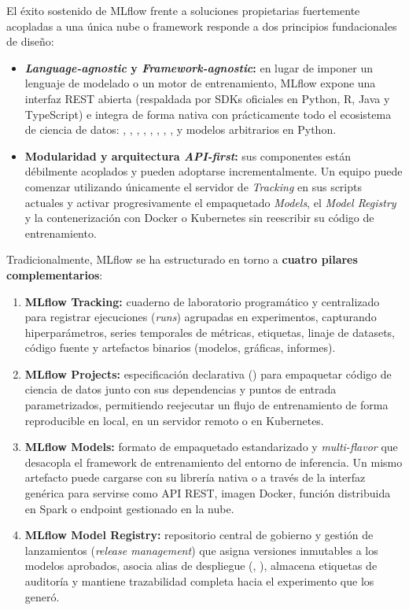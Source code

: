 El éxito sostenido de MLflow frente a soluciones propietarias fuertemente acopladas a una única nube o framework responde a dos principios fundacionales de diseño:

\begin{itemize}
  \item \textbf{\textit{Language-agnostic} y \textit{Framework-agnostic}:} en lugar de imponer un lenguaje de modelado o un motor de entrenamiento, MLflow expone una interfaz REST abierta (respaldada por SDKs oficiales en Python, R, Java y TypeScript) e integra de forma nativa con prácticamente todo el ecosistema de ciencia de datos: , , , , , , , ,  y modelos arbitrarios en Python.
  \item \textbf{Modularidad y arquitectura \textit{API-first}:} sus componentes están débilmente acoplados y pueden adoptarse incrementalmente. Un equipo puede comenzar utilizando únicamente el servidor de \textit{Tracking} en sus scripts actuales y activar progresivamente el empaquetado \textit{Models}, el \textit{Model Registry} y la contenerización con Docker o Kubernetes sin reescribir su código de entrenamiento.
\end{itemize}

Tradicionalmente, MLflow se ha estructurado en torno a \textbf{cuatro pilares complementarios}:

\begin{enumerate}
  \item \textbf{MLflow Tracking:} cuaderno de laboratorio programático y centralizado para registrar ejecuciones (\textit{runs}) agrupadas en experimentos, capturando hiperparámetros, series temporales de métricas, etiquetas, linaje de datasets, código fuente y artefactos binarios (modelos, gráficas, informes).
  \item \textbf{MLflow Projects:} especificación declarativa () para empaquetar código de ciencia de datos junto con sus dependencias y puntos de entrada parametrizados, permitiendo reejecutar un flujo de entrenamiento de forma reproducible en local, en un servidor remoto o en Kubernetes.
  \item \textbf{MLflow Models:} formato de empaquetado estandarizado y \textit{multi-flavor} que desacopla el framework de entrenamiento del entorno de inferencia. Un mismo artefacto puede cargarse con su librería nativa o a través de la interfaz genérica  para servirse como API REST, imagen Docker, función distribuida en Spark o endpoint gestionado en la nube.
  \item \textbf{MLflow Model Registry:} repositorio central de gobierno y gestión de lanzamientos (\textit{release management}) que asigna versiones inmutables a los modelos aprobados, asocia alias de despliegue (, ), almacena etiquetas de auditoría y mantiene trazabilidad completa hacia el experimento que los generó.
\end{enumerate}

